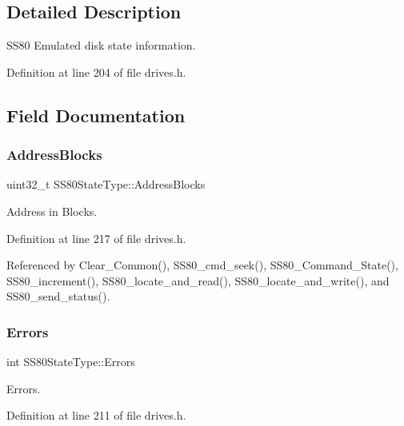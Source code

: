 \subsection{Detailed Description}
S\+S80 Emulated disk state information. 

Definition at line 204 of file drives.\+h.



\subsection{Field Documentation}
\mbox{\label{structSS80StateType_a6cffa1e36a57bce4188ede4bd9dbd7ad}} 
\subsubsection{\texorpdfstring{Address\+Blocks}{AddressBlocks}}
{\footnotesize\ttfamily uint32\+\_\+t S\+S80\+State\+Type\+::\+Address\+Blocks}



Address in Blocks. 



Definition at line 217 of file drives.\+h.



Referenced by Clear\+\_\+\+Common(), S\+S80\+\_\+cmd\+\_\+seek(), S\+S80\+\_\+\+Command\+\_\+\+State(), S\+S80\+\_\+increment(), S\+S80\+\_\+locate\+\_\+and\+\_\+read(), S\+S80\+\_\+locate\+\_\+and\+\_\+write(), and S\+S80\+\_\+send\+\_\+status().

\mbox{\label{structSS80StateType_a7a5c363c6f617ee457a4daacadb3a7b2}} 
\subsubsection{\texorpdfstring{Errors}{Errors}}
{\footnotesize\ttfamily int S\+S80\+State\+Type\+::\+Errors}



Errors. 



Definition at line 211 of file drives.\+h.



